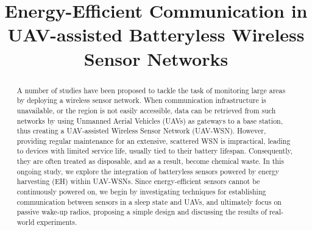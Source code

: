 \documentclass[conference]{IEEEtran}
\begin{document}
\title{Energy-Efficient Communication in UAV-assisted Batteryless Wireless Sensor Networks}

\author{
  \and
  \and
  \and
}

\maketitle

\begin{abstract}
  A number of studies have been proposed to tackle the task of monitoring large areas by deploying a wireless sensor network. When communication infrastructure is unavailable, or the region is not easily accessible, data can be retrieved from such networks by using Unmanned Aerial Vehicles (UAVs) as gateways to a base station, thus creating a UAV-assisted Wireless Sensor Network (UAV-WSN). However, providing regular maintenance for an extensive, scattered WSN is impractical, leading to devices with limited service life, usually tied to their battery lifespan. Consequently, they are often treated as disposable, and as a result, become chemical waste. In this ongoing study, we explore the integration of batteryless sensors powered by energy harvesting (EH) within UAV-WSNs. Since energy-efficient sensors cannot be continuously powered on, we begin by investigating techniques for establishing communication between sensors in a sleep state and UAVs, and ultimately focus on passive wake-up radios, proposing a simple design and discussing the results of real-world experiments.
\end{abstract}
\end{document}
